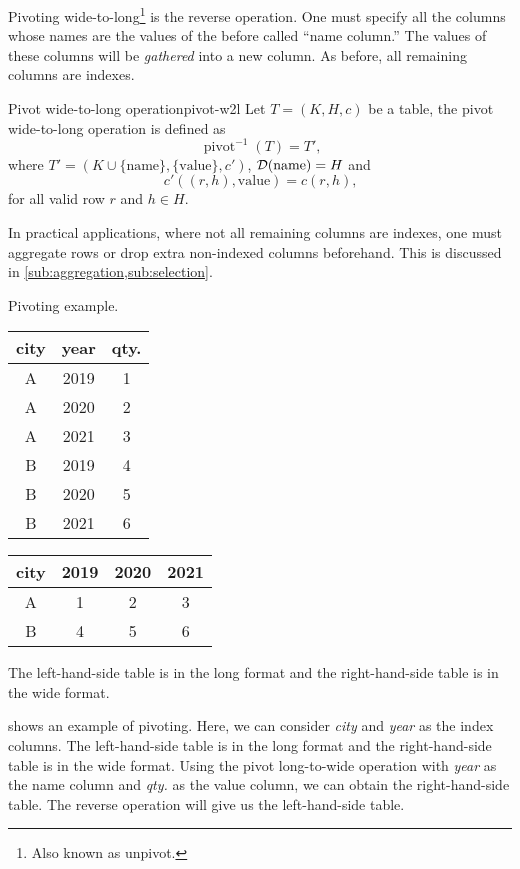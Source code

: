 Pivoting wide-to-long\footnote{Also known as unpivot.} is the reverse operation. One must
specify all the columns whose names are the values of the before called ``name column.''
The values of these columns will be \emph{gathered} into a new column. As before, all
remaining columns are indexes.

\begin{defbox}{Pivot wide-to-long operation}{pivot-w2l}
  Let $T = (K, H, c)$ be a table, the pivot wide-to-long
  operation is defined as \[
    \operatorname{pivot}^{-1}(T) = T'\text{,}
  \] where $T' = (K \cup \{\text{name}\}, \{\text{value}\}, c')$, $\mathcal{D}\!\left(\text{name}\right)
  = H$ and \[
    c'((r, h), \text{value}) = c(r, h)\text{,}
  \] for all valid row $r$ and $h \in H$.
\end{defbox}

In practical applications, where not all remaining columns are indexes, one must aggregate
rows or drop extra non-indexed columns beforehand.  This is discussed in
\cref{sub:aggregation,sub:selection}.

\begin{tablebox}[label=tab:pivot]{Pivoting example.}
    \centering
    \begin{tabular}{ccc}
      \toprule
      \textbf{city} & \textbf{year} & \textbf{qty.} \\
      \midrule
      A & 2019 & 1 \\
      A & 2020 & 2 \\
      A & 2021 & 3 \\
      B & 2019 & 4 \\
      B & 2020 & 5 \\
      B & 2021 & 6 \\
      \bottomrule
    \end{tabular}
    \begin{tabular}{cccc}
      \toprule
      \textbf{city} & \textbf{2019} & \textbf{2020} & \textbf{2021} \\
      \midrule
      A & 1 & 2 & 3 \\
      B & 4 & 5 & 6 \\
      \bottomrule
    \end{tabular}
  \tcblower
  The left-hand-side table is in the long format and the right-hand-side table is in the
  wide format.
\end{tablebox}

 shows an example of pivoting.  Here, we can consider \emph{city} and
\emph{year} as the index columns.  The left-hand-side table is in the long format and the
right-hand-side table is in the wide format.  Using the pivot long-to-wide operation with
\emph{year} as the name column and \emph{qty.} as the value column, we can obtain the
right-hand-side table.  The reverse operation will give us the left-hand-side table.

